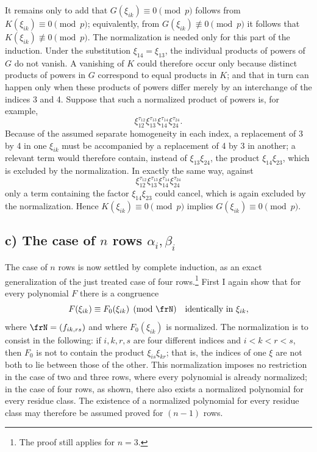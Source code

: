 \documentclass[11pt]{article}
\begin{document}
It remains only to add that \(G(\xi_{ik})\equiv0\pmod p\) follows from \(K(\xi_{ik})\equiv0\pmod p\); equivalently, from \(G(\xi_{ik})\not\equiv0\pmod p\) it follows that \(K(\xi_{ik})\not\equiv0\pmod p\). The normalization is needed only for this part of the induction. Under the substitution \(\xi_{14}=\xi_{13}\), the individual products of powers of \(G\) do not vanish. A vanishing of \(K\) could therefore occur only because distinct products of powers in \(G\) correspond to equal products in \(K\); and that in turn can happen only when these products of powers differ merely by an interchange of the indices 3 and 4. Suppose that such a normalized product of powers is, for example,
\[
        \xi_{12}^{\tau_{12}}\xi_{13}^{\tau_{13}}\xi_{14}^{\tau_{14}}\xi_{24}^{\tau_{24}}.
\]
Because of the assumed separate homogeneity in each index, a replacement of 3 by 4 in one \(\xi_{ik}\) must be accompanied by a replacement of 4 by 3 in another; a relevant term would therefore contain, instead of \(\xi_{13}\xi_{24}\), the product \(\xi_{14}\xi_{23}\), which is excluded by the normalization. In exactly the same way, against
\[
        \xi_{12}^{\tau_{12}}\xi_{13}^{\tau_{13}}\xi_{14}^{\tau_{14}}\xi_{24}^{\tau_{24}}
\]
only a term containing the factor \(\xi_{14}\xi_{23}\) could cancel, which is again excluded by the normalization. Hence \(K(\xi_{ik})\equiv0\pmod p\) implies \(G(\xi_{ik})\equiv0\pmod p\).

\subsection*{c) The case of \(n\) rows \(\alpha_i,\beta_i\)}

The case of \(n\) rows is now settled by complete induction, as an exact generalization of the just treated case of four rows.\footnote{The proof still applies for \(n=3\).}
First I again show that for every polynomial \(F\) there is a congruence
\begin{equation}
        F(\xi_{ik})\equiv F_0(\xi_{ik})\pmod{\frN}
        \quad \text{identically in \(\xi_{ik}\)},
\end{equation}
where \(\frN=(f_{ik,rs})\) and where \(F_0(\xi_{ik})\) is normalized. The normalization is to consist in the following: if \(i,k,r,s\) are four different indices and \(i<k<r<s\), then \(F_0\) is not to contain the product \(\xi_{is}\xi_{kr}\); that is, the indices of one \(\xi\) are not both to lie between those of the other. This normalization imposes no restriction in the case of two and three rows, where every polynomial is already normalized; in the case of four rows, as shown, there also exists a normalized polynomial for every residue class. The existence of a normalized polynomial for every residue class may therefore be assumed proved for \((n-1)\) rows.
\end{document}

